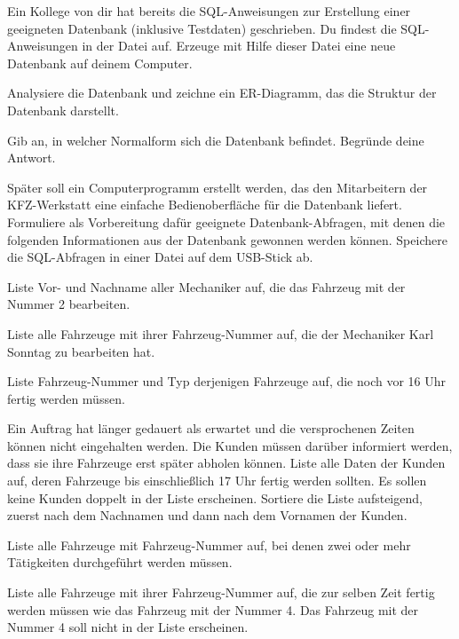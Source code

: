 Ein Kollege von dir hat bereits die SQL-Anweisungen zur Erstellung einer
geeigneten Datenbank (inklusive Testdaten) geschrieben. Du findest die
SQL-Anweisungen in der Datei  auf. Erzeuge mit Hilfe
dieser Datei eine neue Datenbank auf deinem Computer.

\begin{compactenum}[a)]
\item Analysiere die Datenbank und zeichne ein ER-Diagramm, das die Struktur der
 Datenbank darstellt.
\item Gib an, in welcher Normalform sich die Datenbank 
befindet. Begründe deine Antwort.
\item Später soll ein Computerprogramm erstellt werden, das den Mitarbeitern der
KFZ-Werkstatt eine einfache Bedienoberfläche für die Datenbank liefert.
Formuliere als Vorbereitung dafür geeignete Datenbank-Abfragen, mit denen die
folgenden Informationen aus der Datenbank  gewonnen
werden können. Speichere die SQL-Abfragen in einer Datei auf dem USB-Stick ab.

\begin{compactenum}[1.]
\item Liste Vor- und Nachname aller Mechaniker auf, die das Fahrzeug mit der
Nummer 2 bearbeiten.
\item Liste alle Fahrzeuge mit ihrer Fahrzeug-Nummer auf, die der Mechaniker
Karl Sonntag zu bearbeiten hat.
\item Liste Fahrzeug-Nummer und Typ derjenigen Fahrzeuge auf, die noch vor 16
Uhr fertig werden müssen.
\item Ein Auftrag hat länger gedauert als erwartet und die versprochenen Zeiten
können nicht eingehalten werden. Die Kunden müssen darüber informiert werden,
dass sie ihre Fahrzeuge erst später abholen können. Liste alle Daten der Kunden
auf, deren Fahrzeuge bis einschließlich 17 Uhr fertig werden sollten. Es sollen
keine Kunden doppelt in der Liste erscheinen. Sortiere die Liste aufsteigend,
zuerst nach dem Nachnamen und dann nach dem Vornamen der Kunden.
\item Liste alle Fahrzeuge mit Fahrzeug-Nummer auf, bei denen zwei oder mehr
Tätigkeiten durchgeführt werden müssen.
\item Liste alle Fahrzeuge mit ihrer Fahrzeug-Nummer auf, die zur selben Zeit
fertig werden müssen wie das Fahrzeug mit der Nummer 4. Das Fahrzeug mit der
Nummer 4 soll nicht in der Liste erscheinen.
\end{compactenum}
\end{compactenum}


